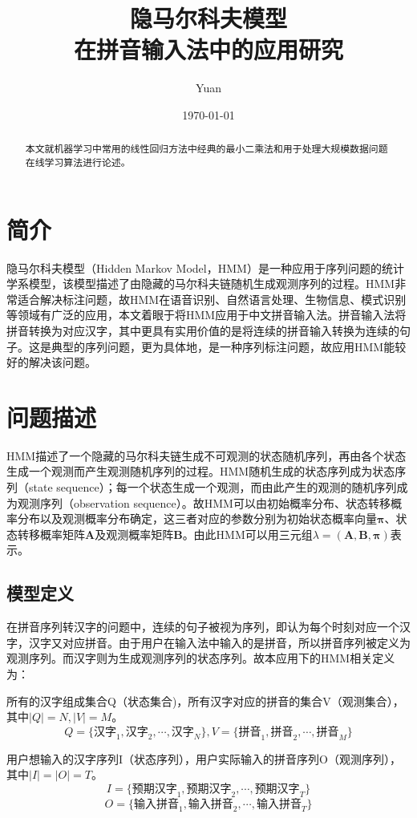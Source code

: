 \documentclass[12pt,a4paper,draft]{ctexart}
\title{隐马尔科夫模型 \\
	在拼音输入法中的应用研究}
\author{Yuan}
\date{\small\today}
\begin{document}
\maketitle
\begin{abstract}
本文就机器学习中常用的线性回归方法中经典的最小二乘法和用于处理大规模数据问题在线学习算法进行论述。
\end{abstract}	
\section{简介}
隐马尔科夫模型（Hidden Markov Model，HMM）是一种应用于序列问题的统计学系模型，该模型描述了由隐藏的马尔科夫链随机生成观测序列的过程。HMM非常适合解决标注问题，故HMM在语音识别、自然语言处理、生物信息、模式识别等领域有广泛的应用，本文着眼于将HMM应用于中文拼音输入法。拼音输入法将拼音转换为对应汉字，其中更具有实用价值的是将连续的拼音输入转换为连续的句子。这是典型的序列问题，更为具体地，是一种序列标注问题，故应用HMM能较好的解决该问题。
\section{问题描述}
HMM描述了一个隐藏的马尔科夫链生成不可观测的状态随机序列，再由各个状态生成一个观测而产生观测随机序列的过程。HMM随机生成的状态序列成为状态序列（state sequence）；每一个状态生成一个观测，而由此产生的观测的随机序列成为观测序列（observation sequence）。故HMM可以由初始概率分布、状态转移概率分布以及观测概率分布确定，这三者对应的参数分别为初始状态概率向量$ \bm{\pi} $、状态转移概率矩阵$\bm{A}$及观测概率矩阵$\bm{B}$。由此HMM可以用三元组$ \lambda=(\bm{A},\bm{B},\bm{\pi}) $表示\cite{李航统计学习}。
\subsection{模型定义}
在拼音序列转汉字的问题中，连续的句子被视为序列，即认为每个时刻对应一个汉字，汉字又对应拼音。由于用户在输入法中输入的是拼音，所以拼音序列被定义为观测序列。而汉字则为生成观测序列的状态序列。故本应用下的HMM相关定义为：


所有的汉字组成集合Q（状态集合)，所有汉字对应的拼音的集合V（观测集合），其中$ |Q|=N, |V|=M $。
\[ Q=\{ \mbox{汉字}_1,\mbox{汉字}_2,\cdots,\mbox{汉字}_N \},V=\{ \mbox{拼音}_1,\mbox{拼音}_2,\cdots,\mbox{拼音}_M \}  \]

用户想输入的汉字序列I（状态序列），用户实际输入的拼音序列O（观测序列），其中$ |I|=|O|=T $。
\[ I=\{ \mbox{预期汉字}_1,\mbox{预期汉字}_2,\cdots,\mbox{预期汉字}_T \}	\]
\[O=\{ \mbox{输入拼音}_1,\mbox{输入拼音}_2,\cdots,\mbox{输入拼音}_T \}  \]
\end{document}

